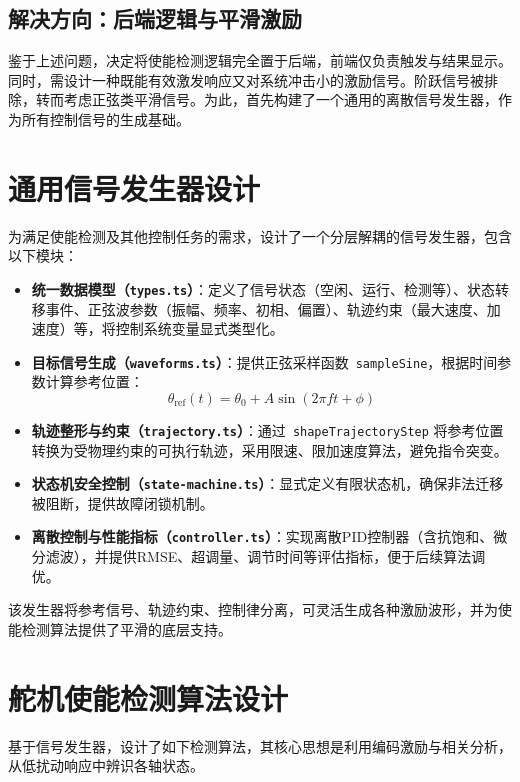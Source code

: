 \documentclass{ctexart}
\begin{document}
\subsection{解决方向：后端逻辑与平滑激励}

鉴于上述问题，决定将使能检测逻辑完全置于后端，前端仅负责触发与结果显示。同时，需设计一种既能有效激发响应又对系统冲击小的激励信号。阶跃信号被排除，转而考虑正弦类平滑信号。为此，首先构建了一个通用的离散信号发生器，作为所有控制信号的生成基础。

\section{通用信号发生器设计}

为满足使能检测及其他控制任务的需求，设计了一个分层解耦的信号发生器，包含以下模块：

\begin{itemize}[leftmargin=2.5em]
  \item \textbf{统一数据模型（\texttt{types.ts}）}：定义了信号状态（空闲、运行、检测等）、状态转移事件、正弦波参数（振幅、频率、初相、偏置）、轨迹约束（最大速度、加速度）等，将控制系统变量显式类型化。
  \item \textbf{目标信号生成（\texttt{waveforms.ts}）}：提供正弦采样函数\ \texttt{sampleSine}，根据时间参数计算参考位置：
  \begin{equation}
    \theta_{\text{ref}}(t) = \theta_0 + A \sin(2\pi f t + \phi)
  \end{equation}
  \item \textbf{轨迹整形与约束（\texttt{trajectory.ts}）}：通过\ \texttt{shapeTrajectoryStep} 将参考位置转换为受物理约束的可执行轨迹，采用限速、限加速度算法，避免指令突变。
  \item \textbf{状态机安全控制（\texttt{state-machine.ts}）}：显式定义有限状态机，确保非法迁移被阻断，提供故障闭锁机制。
  \item \textbf{离散控制与性能指标（\texttt{controller.ts}）}：实现离散PID控制器（含抗饱和、微分滤波），并提供RMSE、超调量、调节时间等评估指标，便于后续算法调优。
\end{itemize}

该发生器将参考信号、轨迹约束、控制律分离，可灵活生成各种激励波形，并为使能检测算法提供了平滑的底层支持。

\section{舵机使能检测算法设计}

基于信号发生器，设计了如下检测算法，其核心思想是利用编码激励与相关分析，从低扰动响应中辨识各轴状态。
\end{document}
